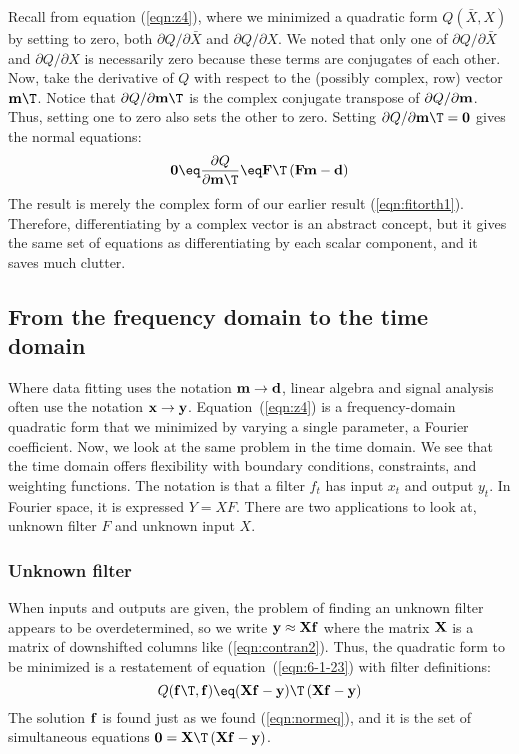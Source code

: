 Recall from equation (\ref{eqn:z4}), where
we minimized a quadratic form $Q(\bar X,X)$
by setting to zero, both
$\partial Q/\partial \bar X$ and $\partial Q/\partial X$.
We noted that only one of
$\partial Q/\partial \bar X$ and $\partial Q/\partial X$
is necessarily zero
because these terms are conjugates of each other.
Now, take the derivative of $Q$
with respect to the (possibly complex, row) vector $\bold m\T$.
Notice that $\partial Q/\partial  \bold m\T$ is the complex conjugate transpose
of $\partial Q/\partial  \bold m$.
Thus, setting one to zero also sets the other to zero.
Setting $\partial Q/\partial \bold m\T =\bold 0$ gives the normal equations:
\begin{equation}
\bold 0 \eq \frac{\partial Q}{\partial \bold m\T} \eq
\bold F\T\,(\bold F \bold m - \bold d)
\label{eqn:normeq}
\end{equation}
The result is merely the complex form of
our earlier result (\ref{eqn:fitorth1}).
Therefore,
differentiating by a complex vector
is an abstract concept,
but it gives the same set of equations
as differentiating by each scalar component,
and it saves much clutter.

\subsection{From the frequency domain to the time domain}
Where data fitting uses
the notation $\bold m \rightarrow \bold d$,
linear algebra and signal analysis often use
the notation $\bold x \rightarrow \bold y$.
Equation~(\ref{eqn:z4}) is a frequency-domain quadratic form
that we minimized by varying a single parameter,
a Fourier coefficient.
Now, we look at the same problem in the time domain.
We see that the time domain offers flexibility with
boundary conditions, constraints, and weighting functions.
The notation is that a filter $f_t$ has input $x_t$ and output $y_t$.
In Fourier space, it is expressed $Y=XF$.
There are two applications to look at,
unknown filter $F$ and unknown input $X$.

\subsubsection{Unknown filter}
When inputs and outputs are given,
the problem of finding an unknown filter appears to be overdetermined,
so we write $\bold y \approx \bold X \bold f$
where the matrix $\bold X$ is a matrix of downshifted columns like
(\ref{eqn:contran2}).
Thus, the quadratic form to be minimized
is a restatement of equation~(\ref{eqn:6-1-23})
with filter definitions:
\begin{equation}
Q(\bold f\T, \bold f) \eq
(\bold X\bold f - \bold y)\T\,
(\bold X\bold f - \bold y)
\end{equation}
The solution $\bold f$ is found just as we found
(\ref{eqn:normeq}),
and it is the set of simultaneous equations
$ \bold 0 = \bold X\T\,(\bold X\bold f - \bold y)$.

